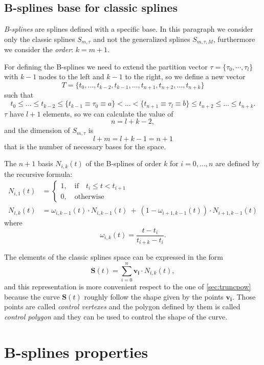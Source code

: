 \documentclass[dissertation.tex]{subfiles}
\begin{document}
\subsection{B-splines base for classic splines}\label{sec:bsplines}
\emph{B-splines} are splines defined with a specific base. In this
paragraph we consider only the classic splines $S_{m,\tau}$ and not
the generalized splines $S_{m,\tau,M}$, furthermore we consider the
\emph{order}: $k=m+1$.

For defining the B-splines we need to extend the partition vector
$\tau=\{\tau_0,\cdots,\tau_l\}$ with $k-1$ nodes to the left and $k-1$ to
the right, so we define a new vector
$$
T=\{t_0,\dots,t_{k-2},t_{k-1},\dots,t_{n+1},t_{n+2},\dots,t_{n+k}\}
$$
such that
$$
t_0\leq\dots\leq t_{k-2}\leq \{t_{k-1}\equiv\tau_0\equiv a\}<\dots<
\{t_{n+1}\equiv\tau_l\equiv b\}\leq t_{n+2}\leq\dots\leq t_{n+k}.
$$
$\tau$ have $l+1$ elements, so we can calculate the value of
$$
n=l+k-2,
$$
and the dimension of $S_{m,\tau}$ is
$$
l+m=l+k-1=n+1
$$
that is the number of necessary bases for the space.

The $n+1$ basis $N_{i,k}(t)$ of the B-splines of order $k$ for
$i=0,\dots,n$ are defined by the 
recursive formula:
\begin{align*}
  N_{i,1}(t) &=
  \begin{cases}
    1,\quad \mbox{if}\quad t_i\leq t<t_{i+1}\\
    0,\quad \mbox{otherwise}
  \end{cases}\\
  N_{i,k}(t) &= \omega_{i,k-1}(t)\cdot N_{i,k-1}(t)\ +\
  (1-\omega_{i+1,k-1}(t))\cdot N_{i+1,k-1}(t)
\end{align*}
where
$$
\omega_{i,k}(t) = \frac{t-t_i}{t_{i+k}-t_i}.
$$

The elements of the classic splines space can be expressed in the form
$$
\mathbf{S}(t)=\sum_{i=0}^n\mathbf{v_i}\cdot N_{i,k}(t),
$$
and this representation is more convenient respect to the one of
\cref{sec:truncpow} because the curve $\mathbf{S}(t)$ roughly
follow the shape given by the points $\mathbf{v_i}$. Those points are
called \emph{control vertexes} and the polygon defined by them is
called \emph{control polygon} and they can be used to control the
shape of the curve.

\section{B-splines properties}\label{sec:bsplineProp}
\end{document}
